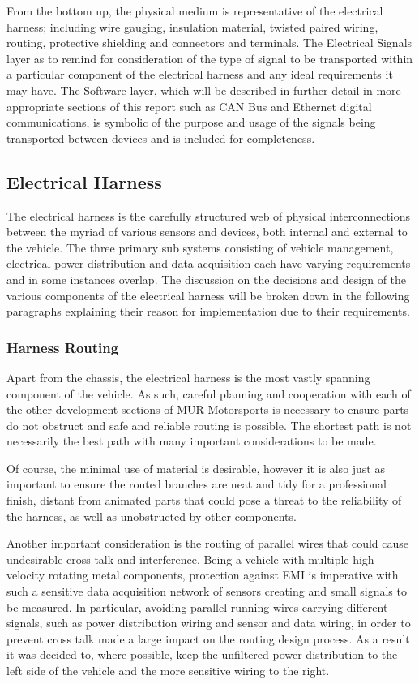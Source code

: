 From the bottom up, the physical medium is representative of the electrical harness; including wire gauging, insulation material, twisted paired wiring, routing, protective shielding and connectors and terminals.  The Electrical Signals layer as to remind for consideration of the type of signal to be transported within a particular component of the electrical harness and any ideal requirements it may have.  The Software layer, which will be described in further detail in more appropriate sections of this report such as CAN Bus and Ethernet digital communications, is symbolic of the purpose and usage of the signals being transported between devices and is included for completeness.

\subsection{Electrical Harness}
The electrical harness is the carefully structured web of physical interconnections between the myriad of various sensors and devices, both internal and external to the vehicle.  The three primary sub systems consisting of vehicle management, electrical power distribution and data acquisition each have varying requirements and in some instances overlap.  The discussion on the decisions and design of the various components of the electrical harness will be broken down in the following paragraphs explaining their reason for implementation due to their requirements.

\subsubsection{Harness Routing}
Apart from the chassis, the electrical harness is the most vastly spanning component of the vehicle.  As such, careful planning and cooperation with each of the other development sections of MUR Motorsports is necessary to ensure parts do not obstruct and safe and reliable routing is possible.  The shortest path is not necessarily the best path with many important considerations to be made.

Of course, the minimal use of material is desirable, however it is also just as important to ensure the routed branches are neat and tidy for a professional finish, distant from animated parts that could pose a threat to the reliability of the harness, as well as unobstructed by other components.  

Another important consideration is the routing of parallel wires that could cause undesirable cross talk and interference.  Being a vehicle with multiple high velocity rotating metal components, protection against EMI is imperative with such a sensitive data acquisition network of sensors creating and small signals to be measured.  In particular, avoiding parallel running wires carrying different signals, such as power distribution wiring and sensor and data wiring, in order to prevent cross talk made a large impact on the routing design process.  As a result it was decided to, where possible, keep the unfiltered power distribution to the left side of the vehicle and the more sensitive wiring to the right.

